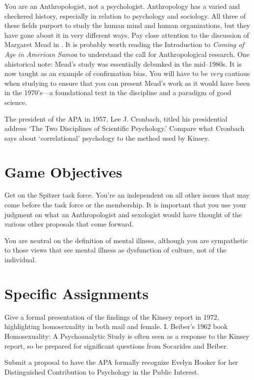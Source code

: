 \begin{refsection}
You are an Anthropologist, not a psychologist. Anthropology has a varied and checkered history, especially in relation to psychology and sociology. All three of these fields purport to study the human mind and human organizations, but they have gone about it in very different ways. Pay close attention to the discussion of Margaret Mead in . It is probably worth reading the Introduction to \emph{Coming of Age in American Samoa} to understand the call for Anthropological research. One ahistorical note: Mead's study was essentially debunked in the mid--1980s. It is now taught as an example of confirmation bias. You will have to be \emph{very} cautious when studying to ensure that you can present Mead's work as it would have been in the 1970's---a foundational text in the discipline and a paradigm of good science. 

The president of the APA in 1957, Lee J. Cronbach, titled his presidential address `The Two Disciplines of Scientific Psychology.' Compare what Cronbach says about `correlational' psychology to the method used by Kinsey. 

\section{Game Objectives}
\label{gameobjectives}

Get on the Spitzer task force. You're an independent on all other issues that may come before the task force or the membership. It is important that you use your judgment on what an Anthropologist and sexologist would have thought of the various other proposals that come forward.

You are neutral on the definition of mental illness, although you are sympathetic to those views that see mental illness as dysfunction of culture, not of the individual. 

\section{Specific Assignments}
\label{specificassignments}

Give a formal presentation of the findings of the Kinsey report in 1972, highlighting homosexuality in both mail and female. I. Beiber's 1962 book Homosexuality: A Psychoanalytic Study is often seen as a response to the Kinsey report, so be prepared for significant questions from Socarides and Beiber.

Submit a proposal to have the APA formally recognize Evelyn Hooker for her Distinguished Contribution to Psychology in the Public Interest.


\end{refsection}
